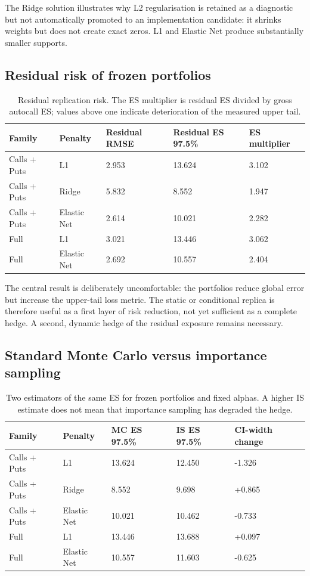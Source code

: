 \documentclass[11pt,a4paper]{article}
\begin{document}
The Ridge solution illustrates why L2 regularisation is retained as a diagnostic but not automatically promoted to an implementation candidate: it shrinks weights but does not create exact zeros. L1 and Elastic Net produce substantially smaller supports.

\subsection{Residual risk of frozen portfolios}

\begin{table}[htbp]
\centering
\small
\begin{tabularx}{\textwidth}{L{2.5cm}L{2.5cm}R{2.4cm}R{2.7cm}R{2.5cm}}
\toprule
Family & Penalty & Residual RMSE & Residual ES 97.5\% & ES multiplier \\
\midrule
Calls + Puts & L1 & 2.953 & 13.624 & 3.102 \\
Calls + Puts & Ridge & 5.832 & 8.552 & 1.947 \\
Calls + Puts & Elastic Net & 2.614 & 10.021 & 2.282 \\
Full & L1 & 3.021 & 13.446 & 3.062 \\
Full & Elastic Net & 2.692 & 10.557 & 2.404 \\
\bottomrule
\end{tabularx}
\caption{Residual replication risk. The ES multiplier is residual ES divided by gross autocall ES; values above one indicate deterioration of the measured upper tail.}
\end{table}

The central result is deliberately uncomfortable: the portfolios reduce global error but increase the upper-tail loss metric. The static or conditional replica is therefore useful as a first layer of risk reduction, not yet sufficient as a complete hedge. A second, dynamic hedge of the residual exposure remains necessary.

\subsection{Standard Monte Carlo versus importance sampling}

\begin{table}[htbp]
\centering
\small
\begin{tabularx}{\textwidth}{L{2.5cm}L{2.5cm}R{2.1cm}R{2.1cm}R{2.3cm}}
\toprule
Family & Penalty & MC ES 97.5\% & IS ES 97.5\% & CI-width change \\
\midrule
Calls + Puts & L1 & 13.624 & 12.450 & -1.326 \\
Calls + Puts & Ridge & 8.552 & 9.698 & +0.865 \\
Calls + Puts & Elastic Net & 10.021 & 10.462 & -0.733 \\
Full & L1 & 13.446 & 13.688 & +0.097 \\
Full & Elastic Net & 10.557 & 11.603 & -0.625 \\
\bottomrule
\end{tabularx}
\caption{Two estimators of the same ES for frozen portfolios and fixed alphas. A higher IS estimate does not mean that importance sampling has degraded the hedge.}
\end{table}
\end{document}
